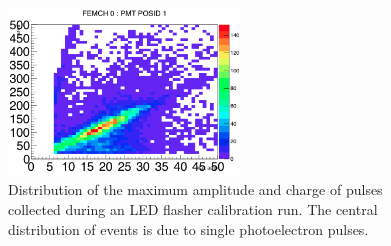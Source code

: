 \begin{figure}[t]
\centering 
\includegraphics[width=0.55\textwidth]{./light_figures/h2_ch0_pmt1.png}
\caption{Distribution of the maximum amplitude and charge of pulses collected during an LED flasher calibration run. The central distribution of events is due to single photoelectron pulses.}
 \label{fig:example_spe_pulsedist} 
\end{figure}




